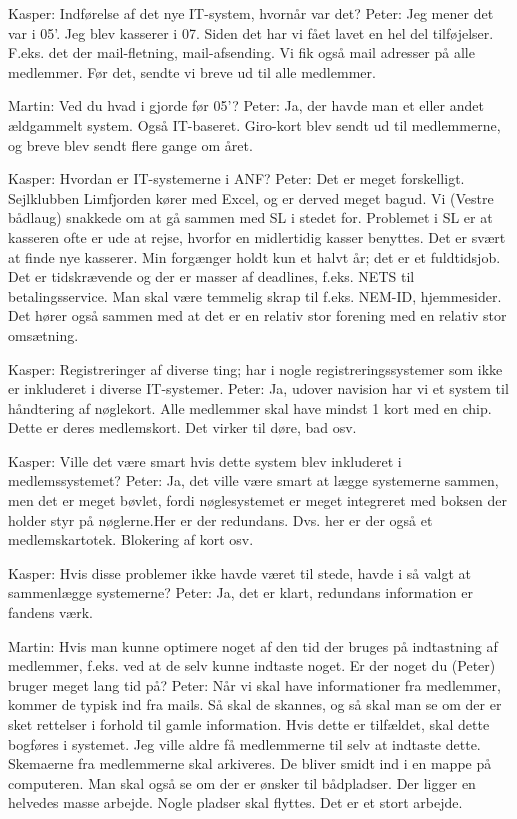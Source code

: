 \documentclass[a4paper]{article}
\begin{document}
Kasper: Indførelse af det nye IT-system, hvornår var det?
Peter: Jeg mener det var i 05'. Jeg blev kasserer i 07. Siden det har vi fået lavet en hel del tilføjelser. F.eks. det der mail-fletning, mail-afsending. Vi fik også mail adresser på alle medlemmer. Før det, sendte vi breve ud til alle medlemmer.

Martin: Ved du hvad i gjorde før 05'?
Peter: Ja, der havde man et eller andet ældgammelt system. Også IT-baseret. Giro-kort blev sendt ud til medlemmerne, og breve blev sendt flere gange om året.

Kasper: Hvordan er IT-systemerne i ANF?
Peter: Det er meget forskelligt. Sejlklubben Limfjorden kører med Excel, og er derved meget bagud. Vi (Vestre bådlaug) snakkede om at gå sammen med SL i stedet for. Problemet i SL er at kasseren ofte er ude at rejse, hvorfor en midlertidig kasser benyttes. Det er svært at finde nye kasserer. Min forgænger holdt kun et halvt år; det er et fuldtidsjob. Det er tidskrævende og der er masser af deadlines, f.eks. NETS til betalingsservice. Man skal være temmelig skrap til f.eks. NEM-ID, hjemmesider. Det hører også sammen med at det er en relativ stor forening med en relativ stor omsætning.

Kasper: Registreringer af diverse ting; har i nogle registreringssystemer som ikke er inkluderet i diverse IT-systemer.
Peter: Ja, udover navision har vi et system til håndtering af nøglekort. Alle medlemmer skal have mindst 1 kort med en chip. Dette er deres medlemskort. Det virker til døre, bad osv.

Kasper: Ville det være smart hvis dette system blev inkluderet i medlemssystemet?
Peter: Ja, det ville være smart at lægge systemerne sammen, men det er meget bøvlet, fordi nøglesystemet er meget integreret med boksen der holder styr på nøglerne.Her er der redundans. Dvs. her er der også et medlemskartotek. Blokering af kort osv. 

Kasper: Hvis disse problemer ikke havde været til stede, havde i så valgt at sammenlægge systemerne?
Peter: Ja, det er klart, redundans information er fandens værk.

Martin: Hvis man kunne optimere noget af den tid der bruges på indtastning af medlemmer, f.eks. ved at de selv kunne indtaste noget. Er der noget du (Peter) bruger meget lang tid på?
Peter: Når vi skal have informationer fra medlemmer, kommer de typisk ind fra mails. Så skal de skannes, og så skal man se om der er sket rettelser i forhold til gamle information. Hvis dette er tilfældet, skal dette bogføres i systemet. Jeg ville aldre få medlemmerne til selv at indtaste dette. Skemaerne fra medlemmerne skal arkiveres. De bliver smidt ind i en mappe på computeren. Man skal også se om der er ønsker til bådpladser. Der ligger en helvedes masse arbejde. Nogle pladser skal flyttes. Det er et stort arbejde.
\end{document}
